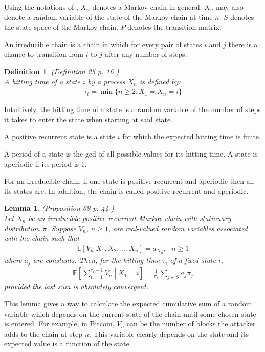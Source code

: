 \documentclass{article}
\newcommand{\E}[1]{\mathbb{E} \left[ #1 \right]}
\newtheorem{definition}{Definition}
\newtheorem{lemma}[theorem]{Lemma}
\begin{document}
Using the notations of \cite{white2001markov}, $X_n$ denotes a Markov chain in general.
$X_n$ may also denote a random variable of the state of the Markov chain at time $n$.
$S$ denotes the state space of the Markov chain.
$P$ denotes the transition matrix.

An irreducible chain is a chain in which for every pair of states $i$ and $j$ there is a chance to transition from $i$ to $j$ after any number of steps.

\begin{definition}
    (Definition 25 p. 16 \cite{white2001markov}) \\
    A hitting time of a state $i$ by a process $X_n$ is defined by:
    \begin{gather*}
        \tau_i = \min \{ n \geq 2 : X_1 = X_n = i \}
    \end{gather*}
\end{definition}
Intuitively, the hitting time of a state is a random variable of the number of steps it takes to enter the state when starting at said state.

A positive recurrent state  is a state $i$ for which the expected hitting time is finite.

A period of a state is the gcd of all possible values for its hitting time.
A state is aperiodic if its period is 1.

For an irreducible chain, if one state is positive recurrent and aperiodic then all its states are. In addition, the chain is called positive recurrent and aperiodic.

\begin{lemma}\label{prop69}
    (Proposition 69 p. 44 \cite{white2001markov}) \\
    Let $X_n$ be an irreducible positive recurrent Markov chain with stationary distribution $\pi$.
    Suppose $V_n$, $n \geq 1$, are real-valued random variables associated with the chain such that \\
    \begin{gather*}
        \E{V_n|X_1,X_2,...,X_n} = a_{X_n}, \ \ \ n \geq 1
    \end{gather*}
    where $a_j$ are constants. Then, for the hitting time $\tau_i$ of a fixed state $i$,
    \begin{gather*}
        \E{\sum\limits_{n=1}^{\tau_i - 1} V_n \middle\vert X_1 = i} = \frac{1}{\pi_i} \sum\limits_{j \in S} a_j \pi_j
    \end{gather*}
    provided the last sum is absolutely convergent.
\end{lemma}
This lemma gives a way to calculate the expected cumulative sum of a random variable which depends on the current state of the chain until some chosen state is entered. For example, in Bitcoin, $V_n$ can be the number of blocks the attacker adds to the chain at step $n$. This variable clearly depends on the state and its expected value is a function of the state.
\end{document}
